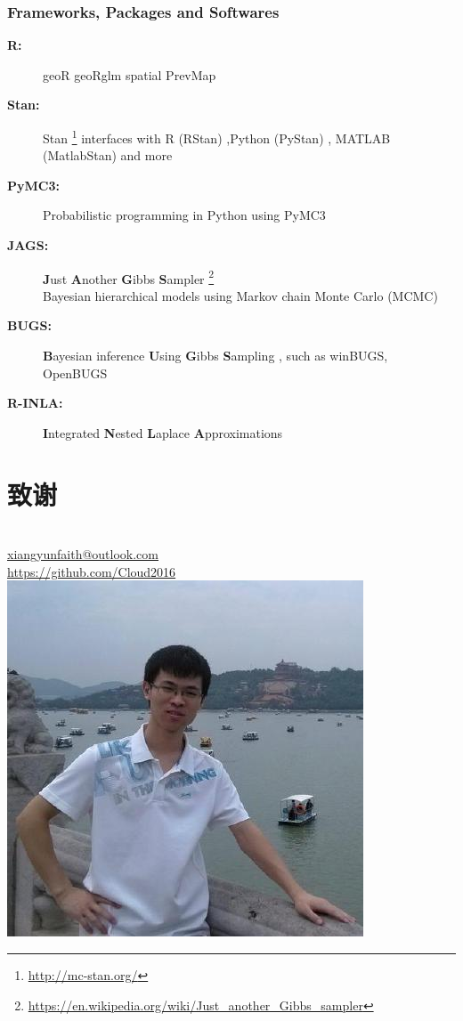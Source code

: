 \documentclass[CJKutf8,xcolor=x11names]{beamer}
\begin{document}
\begin{CJK*}{UTF8}{gkai}
\begin{frame}[allowframebreaks]
\frametitle{Frameworks, Packages and Softwares}

\begin{description}
\item[\textbf{R:}] geoR geoRglm spatial PrevMap \\
\citet{R-geoR,R-geoRglm,R-spatial,Giorgi2016}

\item[\textbf{Stan:}] Stan \footnote{\scriptsize \url{http://mc-stan.org/} }  
interfaces with R (RStan) ,Python (PyStan) , MATLAB (MatlabStan) 
and  more \\ \citet{Stan2015,Stan2017}

\item[\textbf{PyMC3:}] Probabilistic programming in Python using PyMC3 \\ \citet{Salvatier2016}

\item[\textbf{JAGS:}] \textbf{J}ust \textbf{A}nother \textbf{G}ibbs \textbf{S}ampler \footnote{\scriptsize \url{https://en.wikipedia.org/wiki/Just_another_Gibbs_sampler}} \\
Bayesian hierarchical models using Markov chain Monte Carlo (MCMC)
\item[\textbf{BUGS:}] \textbf{B}ayesian inference \textbf{U}sing \textbf{G}ibbs \textbf{S}ampling ,
such as winBUGS, OpenBUGS 
\item[\textbf{R-INLA:}] \textbf{I}ntegrated \textbf{N}ested \textbf{L}aplace \textbf{A}pproximations \\
\citet{Rue2009,R-INLA,Rue2017arXiv}
\end{description}


\end{frame}

\section*{致谢}

\begin{frame}
\centering
\color{red}
\Huge {}\\
\bigskip
\color{Blue4}
\normalsize
\faEnvelope{} \href{mailto:me@somewhere.com}{xiangyunfaith@outlook.com} \\
\faGithub{} \href{https://github.com/Cloud2016}{https://github.com/Cloud2016} \\
\bigskip
\includegraphics[width=10ex,interpolate=true]{me}
\end{frame}


\begin{frame}[allowframebreaks]


\end{frame}

\end{CJK*}
\end{document}
